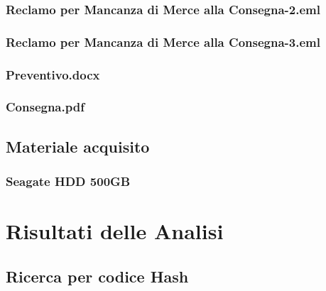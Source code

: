 \documentclass[a4paper,12pt]{report}
\begin{document}
\subsection{Reclamo per Mancanza di Merce alla Consegna-2.eml}
\vspace{5pt}


\subsection{Reclamo per Mancanza di Merce alla Consegna-3.eml}
\vspace{5pt}


\subsection{Preventivo.docx}
\vspace{5pt}


\subsection{Consegna.pdf}
\vspace{5pt}


\pagebreak

\section{Materiale acquisito}
\subsection{Seagate HDD 500GB}


\chapter{Risultati delle Analisi}
\section{Ricerca per codice Hash}

\end{document}
